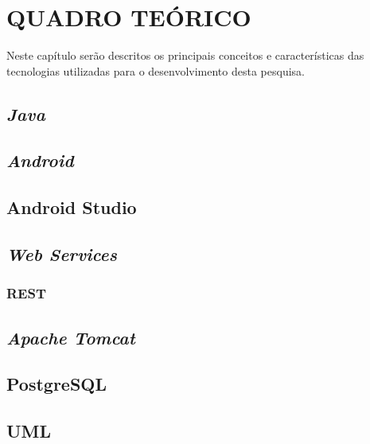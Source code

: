 \chapter{QUADRO TEÓRICO}

	\par Neste capítulo serão descritos os principais conceitos e características
das tecnologias utilizadas para o desenvolvimento desta pesquisa.
	
	\section{\textit{Java}}
		

	\section{\textit{Android}}
		
	
	\section{Android Studio}
		
	
	\section{\textit{Web Services}}
		
			\subsection{REST}
				
	\section{\textit{Apache Tomcat}}
		
	
	\section{PostgreSQL}
		
	
	\section{UML}
		
	
